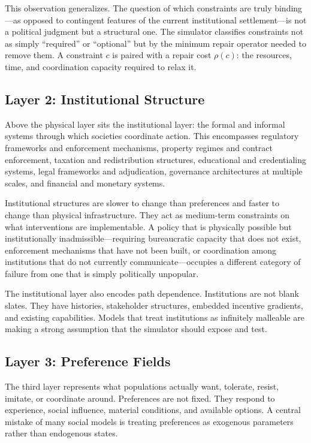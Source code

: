 \documentclass[12pt]{article}
\begin{document}
This observation generalizes. The question of which constraints are truly binding---as opposed to contingent features of the current institutional settlement---is not a political judgment but a structural one. The simulator classifies constraints not as simply ``required'' or ``optional'' but by the minimum repair operator needed to remove them. A constraint $c$ is paired with a repair cost $\rho(c)$: the resources, time, and coordination capacity required to relax it.

\subsection{Layer 2: Institutional Structure}

Above the physical layer sits the institutional layer: the formal and informal systems through which societies coordinate action. This encompasses regulatory frameworks and enforcement mechanisms, property regimes and contract enforcement, taxation and redistribution structures, educational and credentialing systems, legal frameworks and adjudication, governance architectures at multiple scales, and financial and monetary systems.

Institutional structures are slower to change than preferences and faster to change than physical infrastructure. They act as medium-term constraints on what interventions are implementable. A policy that is physically possible but institutionally inadmissible---requiring bureaucratic capacity that does not exist, enforcement mechanisms that have not been built, or coordination among institutions that do not currently communicate---occupies a different category of failure from one that is simply politically unpopular.

The institutional layer also encodes path dependence. Institutions are not blank slates. They have histories, stakeholder structures, embedded incentive gradients, and existing capabilities. Models that treat institutions as infinitely malleable are making a strong assumption that the simulator should expose and test.

\subsection{Layer 3: Preference Fields}

The third layer represents what populations actually want, tolerate, resist, imitate, or coordinate around. Preferences are not fixed. They respond to experience, social influence, material conditions, and available options. A central mistake of many social models is treating preferences as exogenous parameters rather than endogenous states.
\end{document}
